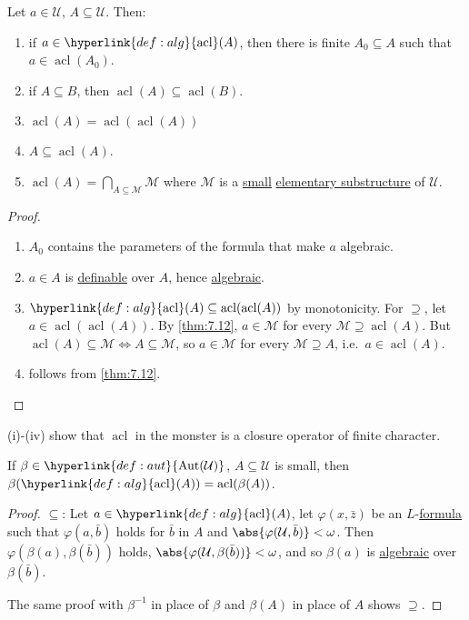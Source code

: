 \documentclass{article}
\DeclareMathOperator{\Aut}{Aut}
\DeclareMathOperator{\acl}{acl}
\newcommand{\U}{\mathcal{U}}
\begin{document}
\begin{nprop}\label{prop:7.13}
  Let $a \in \mathcal{U}$, $A \subseteq \mathcal{U}$. Then:
  \begin{enumerate}[label=(\roman*)]
    \item if $a \in \hyperlink{def:alg}{\acl}(A)$, then there is finite $A_0 \subseteq A$ such that $a \in \acl(A_0)$.
    \item if $A \subseteq B$, then $\acl(A) \subseteq \acl(B)$.
    \item $\acl(A) = \acl(\acl(A))$
    \item $A \subseteq \acl(A)$.
    \item $\acl(A) = \bigcap_{A \subseteq \mathcal{M}} \mathcal{M}$
      where $\mathcal{M}$ is a \hyperlink{def:small}{small} \hyperlink{def:elsubs}{elementary substructure} of $\mathcal{U}$.
  \end{enumerate}
\end{nprop}
\begin{proof}\leavevmode
  \begin{enumerate}[label=(\roman*)]
    \item[(i)] $A_0$ contains the parameters of the formula that make $a$ algebraic.
    \item[(iv)] $a \in A$ is \hyperlink{def:def}{definable} over $A$, hence \hyperlink{def:alg}{algebraic}.
    \item[(iii)] $\hyperlink{def:alg}{\acl}(A) \subseteq \acl(\acl(A))$ by monotonicity.
      For $\supseteq$, let $a \in \acl(\acl(A))$. By \cref{thm:7.12}, $a \in \mathcal{M}$ for every $\mathcal{M} \supseteq \acl(A)$.
      But $\acl(A) \subseteq \mathcal{M} \iff A \subseteq \mathcal{M}$, so $a \in \mathcal{M}$ for every $\mathcal{M} \supseteq A$, i.e.\ $a \in \acl(A)$.
      \item[(v)] follows from \cref{thm:7.12}. \qedhere
  \end{enumerate}
\end{proof}
\begin{remark}
(i)-(iv) show that $\acl$ in the monster is a closure operator of finite character.
\end{remark}
\begin{nprop}\label{prop:7.14}
  If $\beta\in \hyperlink{def:aut}{\Aut(\mathcal{U})}$, $A \subseteq \mathcal{U}$ is small, then $\beta(\hyperlink{def:alg}{\acl}(A)) = \acl(\beta(A))$.
\end{nprop}
\begin{proof}
  $\subseteq$: Let $a \in \hyperlink{def:alg}{\acl}(A)$, let $\varphi(x, \bar{z})$ be an $L$-\hyperlink{def:form}{formula} such that $\varphi(a, \bar{b})$ holds for $\bar{b}$ in $A$ and $\abs{\varphi(\U, \bar{b})} < \omega$.
  Then $\varphi(\beta(a), \beta(\bar{b}))$ holds, $\abs{\varphi(\U, \beta(\bar{b}))} < \omega$, and so $\beta(a)$ is \hyperlink{def:alg}{algebraic} over $\beta(\bar{b})$.

  The same proof with $\beta^{-1}$ in place of $\beta$ and $\beta(A)$ in place of $A$ shows $\supseteq$.
\end{proof}
\end{document}
